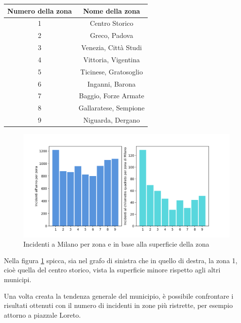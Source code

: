 \documentclass[a4paper]{report}
\begin{document}
\begin{center}
    \def\arraystretch{1.5}%
    \begin{tabular}{ |c|c| } 
    \hline
    Numero della zona & Nome della zona \\ 
    \hline
    \rowcolor{TableGray}
    1   &   Centro Storico\\
    2   &   Greco, Padova\\
    \rowcolor{TableGray}
    3   &   Venezia, Città Studi\\
    4   &   Vittoria, Vigentina \\
    \rowcolor{TableGray}
    5   &   Ticinese, Gratosoglio\\
    6   &   Inganni, Barona\\
    \rowcolor{TableGray}
    7   &   Baggio, Forze Armate\\
    8   &   Gallaratese, Sempione\\
    \rowcolor{TableGray}
    9   &   Niguarda, Dergano\\
    \hline
    \end{tabular}
\end{center}

\begin{figure}
    \includegraphics[width=\linewidth]{../src/municipi_milano/incidenti_superf.png}
    \caption{Incidenti a Milano per zona e in base alla superficie della zona}
    \label{fig:incidenti-chilometro}
\end{figure}

Nella figura \ref{fig:incidenti-chilometro} spicca, sia nel grafo di sinistra che in quello di destra, 
la zona 1, cioè quella del centro storico, vista la superficie minore rispetto agli altri municipi.

Una volta creata la tendenza generale del municipio, è possibile confrontare i risultati 
ottenuti con il numero di incidenti in zone più ristrette, per esempio attorno a piazzale Loreto.
\end{document}
